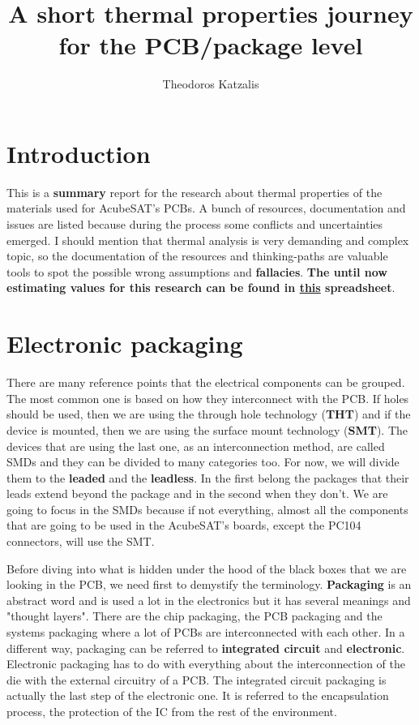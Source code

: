 \documentclass[final]{cubedoc}
\title{A short thermal properties journey for the PCB/package level} %
\author{Theodoros Katzalis}
\begin{document}
	
	\section{Introduction}
	
	This is a \textbf{summary} report for the research about thermal properties of the materials used for AcubeSAT's PCBs. A bunch of resources, documentation and issues are listed because during the process some conflicts and uncertainties emerged. I should mention that thermal analysis is very demanding and complex topic, so the documentation of the resources and thinking-paths are valuable tools to spot the possible wrong assumptions and \textbf{fallacies}. \textbf{The until now estimating values for this research can be found in \href{https://drive.google.com/open?id=1gGPhBZe94Yt7D8FDdGNza4ZnG0pRfhT0xG7Z2tBdK7o}{this} spreadsheet}.
	
	\section{Electronic packaging}
	
	There are many reference points that the electrical components can be grouped. The most common one is based on how they interconnect with the PCB. If holes should be used, then we are using the through hole technology (\textbf{THT}) and if the device is mounted, then we are using the surface mount technology (\textbf{SMT}). The devices that are using the last one, as an interconnection method, are called SMDs and they can be divided to many categories too. For now, we will divide them to the \textbf{leaded} and the \textbf{leadless}. In the first belong the packages that their leads extend beyond the package and in the second when they don't. We are going to focus in the SMDs because if not everything, almost all the components that are going to be used in the AcubeSAT's boards, except the PC104 connectors, will use the SMT. 
	
	Before diving into what is hidden under the hood of the black boxes that we are looking in the PCB, we need first to demystify the terminology. \textbf{Packaging} is an abstract word and is used a lot in the electronics but it has several meanings and "thought layers". There are the chip packaging, the PCB packaging and the systems packaging where a lot of PCBs are interconnected with each other. In a different way, packaging can be referred to \textbf{integrated circuit} and \textbf{electronic}. Electronic packaging has to do with everything about the interconnection of the die with the external circuitry of a PCB. The integrated circuit packaging is actually the last step of the electronic one. It is referred to the encapsulation process, the protection of the IC from the rest of the environment.
	
\end{document}
